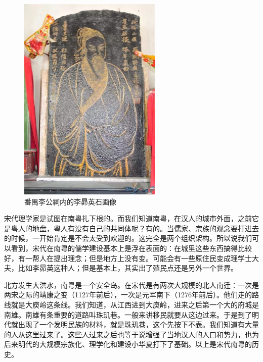 \begin{figure}
	\centering
	\includegraphics[width=\textwidth]{images/image-38}
	\caption{番禺李公祠内的李昴英石画像}
\end{figure}

宋代理学家是试图在南粤扎下根的。而我们知道南粤，在汉人的城市外面，之前它是粤人的地盘，粤人有没有自己的共同体呢？有的。当儒家、宗族的观念要打进去的时候，一开始肯定是不会太受到欢迎的。这完全是两个组织架构。所以说我们可以看到，宋代在南粤的儒学建设基本上是浮在表面的：在城里这些东西搞得比较好，有一帮人在提出理念；但是地方上没有变。可能会有一些原住民变成理学士大夫，比如李昴英这种人；但是基本上，其实出了殖民点还是另外一个世界。

北方发生大洪水，南粤是一个安全岛。在宋代是有两次大规模的北人南迁：一次是两宋之际的靖康之变（1127年前后），一次是元军南下（1276年前后）。他们走的路线就是大庾岭这条线。我们知道，从江西进到大庾岭，进来之后第一个大的府城是南雄。南雄有条重要的道路叫珠玑巷。一般来讲移民就要从这边过来。于是到了明代就出现了一个发明民族的材料，就是珠玑巷，这个先按下不表。我们知道有大量的人从这里过来了。这些人过来之后也等于说增强了当地汉人的人口和势力，也为后来明代的大规模宗族化、理学化和建设小华夏打下了基础。以上是宋代南粤的历史。

